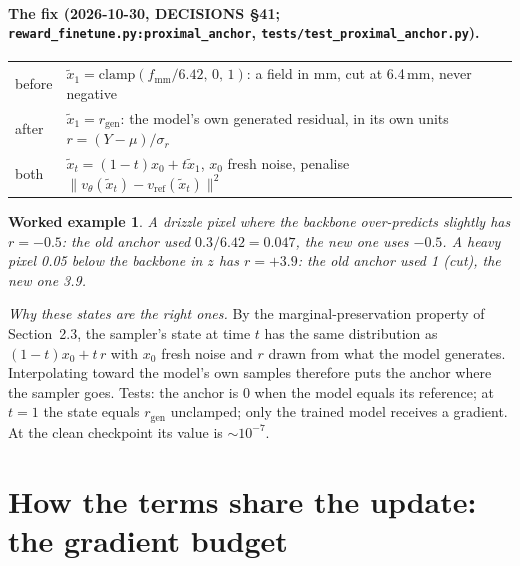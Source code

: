 \documentclass[11pt,a4paper]{article}
\newtheorem*{example}{Worked example}
\begin{document}
\paragraph{The fix (2026-10-30, DECISIONS \S41; \texttt{reward\_finetune.py:proximal\_anchor},
\texttt{tests/test\_proximal\_anchor.py}).}
\begin{center}\small\begin{tabular}{ll}
before & $\tilde x_1 = \mathrm{clamp}(f_{\mathrm{mm}}/6.42,\,0,\,1)$: a field in mm, cut at 6.4\,mm, never negative\\
after & $\tilde x_1 = r_{\mathrm{gen}}$: the model's own generated residual, in its own units $r = (Y-\mu)/\sigma_r$\\
both & $\tilde x_t = (1-t)x_0 + t\tilde x_1$, $x_0$ fresh noise, penalise $\|v_\theta(\tilde x_t)-v_{\mathrm{ref}}(\tilde x_t)\|^2$
\end{tabular}\end{center}
\begin{example}
A drizzle pixel where the backbone over-predicts slightly has $r=-0.5$: the old anchor used $0.3/6.42 = 0.047$, the new
one uses $-0.5$. A heavy pixel 0.05 below the backbone in $z$ has $r = +3.9$: the old anchor used 1 (cut), the new one
3.9.
\end{example}
\noindent \emph{Why these states are the right ones.} By the marginal-preservation property of Section~2.3, the
sampler's state at time $t$ has the same distribution as $(1-t)x_0 + t\,r$ with $x_0$ fresh noise and $r$ drawn from
what the model generates. Interpolating toward the model's own samples therefore puts the anchor where the sampler goes.
Tests: the anchor is 0 when the model equals its reference; at $t=1$ the state equals $r_{\mathrm{gen}}$ unclamped; only
the trained model receives a gradient. At the clean checkpoint its value is $\sim10^{-7}$.

\section{How the terms share the update: the gradient budget}\label{sec:budget}
\end{document}
